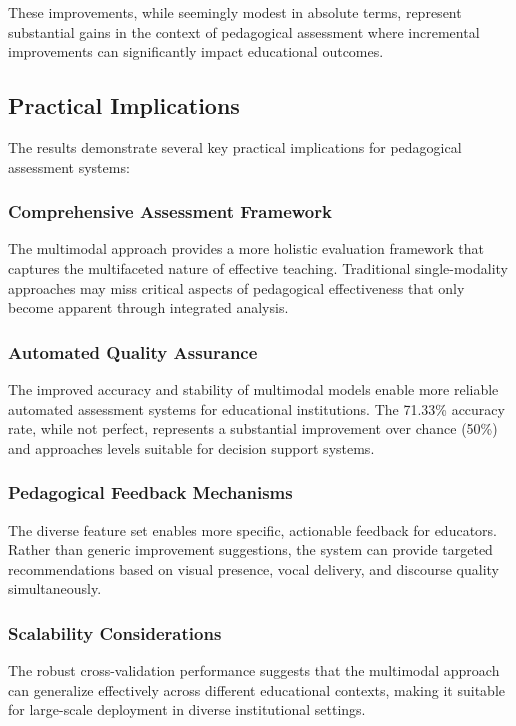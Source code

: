 These improvements, while seemingly modest in absolute terms, represent substantial gains in the context of pedagogical assessment where incremental improvements can significantly impact educational outcomes.

\subsection{Practical Implications}

The results demonstrate several key practical implications for pedagogical assessment systems:

\subsubsection{Comprehensive Assessment Framework}
The multimodal approach provides a more holistic evaluation framework that captures the multifaceted nature of effective teaching. Traditional single-modality approaches may miss critical aspects of pedagogical effectiveness that only become apparent through integrated analysis.

\subsubsection{Automated Quality Assurance}
The improved accuracy and stability of multimodal models enable more reliable automated assessment systems for educational institutions. The 71.33\% accuracy rate, while not perfect, represents a substantial improvement over chance (50\%) and approaches levels suitable for decision support systems.

\subsubsection{Pedagogical Feedback Mechanisms}
The diverse feature set enables more specific, actionable feedback for educators. Rather than generic improvement suggestions, the system can provide targeted recommendations based on visual presence, vocal delivery, and discourse quality simultaneously.

\subsubsection{Scalability Considerations}
The robust cross-validation performance suggests that the multimodal approach can generalize effectively across different educational contexts, making it suitable for large-scale deployment in diverse institutional settings.

